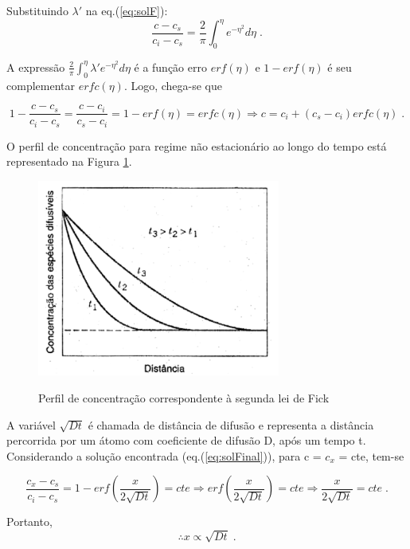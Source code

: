 \documentclass[]{politex}
\begin{document}
Substituindo $\lambda'$ na eq.(\ref{eq:solF}):
\begin{equation} \label{eq:solG}
	\frac{c - c_s}{c_i - c_s} = \frac{2}{\pi} \int_{0}^{\eta} e^{-\eta^2} d\eta   \;.
\end{equation}

A expressão $ \frac{2}{\pi} \int_{0}^{\eta} \lambda'e^{-\eta^2} d\eta $ é a função erro $erf(\eta)$ e  $1 - erf(\eta)$ é seu complementar $erfc(\eta)$. Logo, chega-se que 

\begin{equation} \label{eq:solFinal}
	1 - \frac{c - c_s}{c_i - c_s} = \frac{c - c_i}{c_s - c_i} = 1 - erf(\eta) = erfc(\eta) \Rightarrow c = c_i + (c_s - c_i) erfc(\eta) \;.
\end{equation}

\par O perfil de concentração para regime não estacionário ao longo do tempo está representado na Figura \ref{fig:segundaLei}.

\begin{figure}[ht]
	\caption{Perfil de concentração correspondente à segunda lei de Fick}
	\includegraphics[width=80mm,scale=0.5]{segundaLei}
	\label{fig:segundaLei}
	\centering
\end{figure}

\FloatBarrier

\par
	A variável $\sqrt{Dt}$ é chamada de distância de difusão e representa a distância percorrida por um átomo com coeficiente de difusão D, após um tempo t. Considerando a solução encontrada (eq.(\ref{eq:solFinal})), para c =  $c_x$ = cte, tem-se

$$\frac{c_x - c_s}{c_i - c_s} = 1 - erf(\frac{x}{2\sqrt{Dt}}) = cte \Rightarrow erf(\frac{x}{2\sqrt{Dt}}) = cte \Rightarrow \frac{x}{2\sqrt{Dt}} = cte \;.$$ 

Portanto, 
\begin{equation} \label{eq:difdist}
		\therefore x \propto  \sqrt{Dt} \;.
\end{equation}
\end{document}
